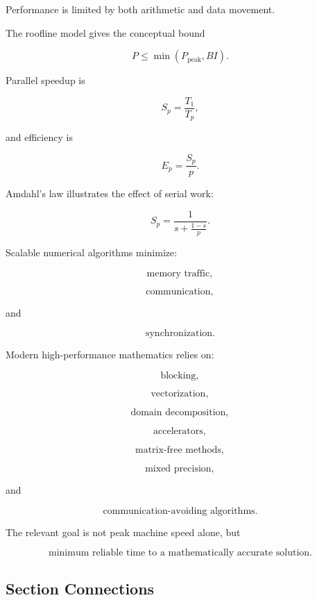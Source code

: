 Performance is limited by both arithmetic and data movement.

The roofline model gives the conceptual bound

\[
\boxed{
P
\leq
\min
\left(
P_{\mathrm{peak}},
BI
\right).
}
\]

Parallel speedup is

\[
\boxed{
S_p
=
\frac{
T_1
}{
T_p
},
}
\]

and efficiency is

\[
\boxed{
E_p
=
\frac{
S_p
}{
p
}.
}
\]

Amdahl's law illustrates the effect of serial work:

\[
\boxed{
S_p
=
\frac{
1
}{
s+\frac{1-s}{p}
}.
}
\]

Scalable numerical algorithms minimize:

\[
\boxed{
\text{memory traffic},
}
\]

\[
\boxed{
\text{communication},
}
\]

and

\[
\boxed{
\text{synchronization}.
}
\]

Modern high-performance mathematics relies on:

\[
\boxed{
\text{blocking},
}
\]

\[
\boxed{
\text{vectorization},
}
\]

\[
\boxed{
\text{domain decomposition},
}
\]

\[
\boxed{
\text{accelerators},
}
\]

\[
\boxed{
\text{matrix-free methods},
}
\]

\[
\boxed{
\text{mixed precision},
}
\]

and

\[
\boxed{
\text{communication-avoiding algorithms}.
}
\]

The relevant goal is not peak machine speed alone, but

\[
\boxed{
\text{minimum reliable time to a mathematically accurate solution}.
}
\]

\subsection{Section Connections}
\label{subsec:hpmc-connections}

